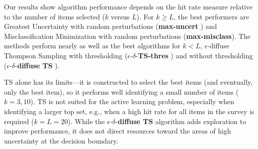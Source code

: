 \documentclass[a4paper,11pt]{article}
\newcommand{\mismin}{\textbf{max-misclass}}
\newcommand{\edts}{$\epsilon$-$\delta$-\textbf{diffuse TS} }
\newcommand{\edtsthres}{$\epsilon$-$\delta$-\textbf{TS-thres} }
\newcommand{\uncert}{\textbf{max-uncert} }
\newcommand{\numperset}{L}
\begin{document}

Our results show algorithm performance depends on the hit rate measure relative to the number of items selected ($k$ versus $\numperset$). For $k \ge L$, the best performers are Greatest Uncertainty with random perturbations (\uncert) and Misclassification Minimization with random perturbations (\mismin). The methods perform nearly as well as the best algorithms for $k < L$, $\epsilon$-diffuse Thompson Sampling with thresholding (\edtsthres) and without thresholding (\edts).

TS alone has its limits---it is constructed to select the best items (and eventually, only the best item), so it performs well identifying a small number of items ($k=3,10$). TS is not suited for the active learning problem, especially when identifying a larger top set, e.g., when a high hit rate for all items in the survey is required ($k=L=20$). While the \edts algorithm adds exploration to improve performance, it does not direct resources toward the areas of high uncertainty at the decision boundary.
\end{document}
